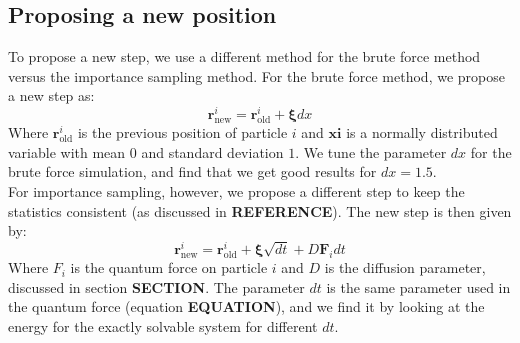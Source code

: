 \documentclass[a4paper, 10pt]{article}
\begin{document}
	\subsection{Proposing a new position}
	To propose a new step, we use a different method for the brute force method versus the importance sampling method. For the brute force method, we propose a new step as:
	\begin{equation}
	\boldsymbol{r}^i_{\mathrm{new}}=\boldsymbol{r}^i_{\mathrm{old}}+\boldsymbol{\xi} dx
	\end{equation}
	Where $\boldsymbol{r}^i_{\mathrm{old}}$ is the previous position of particle $i$ and $\boldsymbol{xi}$ is a normally distributed variable with mean $0$ and standard deviation $1$. We tune the parameter $dx$ for the brute force simulation, and find that we get good results for $dx=1.5$.\\
	\linebreak
	For importance sampling, however, we propose a different step to keep the statistics consistent (as discussed in \textbf{REFERENCE}). The new step is then given by:
	\begin{equation}
	\boldsymbol{r}^i_{\mathrm{new}}=\boldsymbol{r}^i_{\mathrm{old}}+\boldsymbol{\xi} \sqrt{dt}+D\boldsymbol{F}_idt
	\end{equation}
	Where $F_i$ is the quantum force on particle $i$ and $D$ is the diffusion parameter, discussed in section \textbf{SECTION}. The parameter $dt$ is the same parameter used in the quantum force (equation \textbf{EQUATION}), and we find it by looking at the energy for the exactly solvable system for different $dt$.
\end{document}

